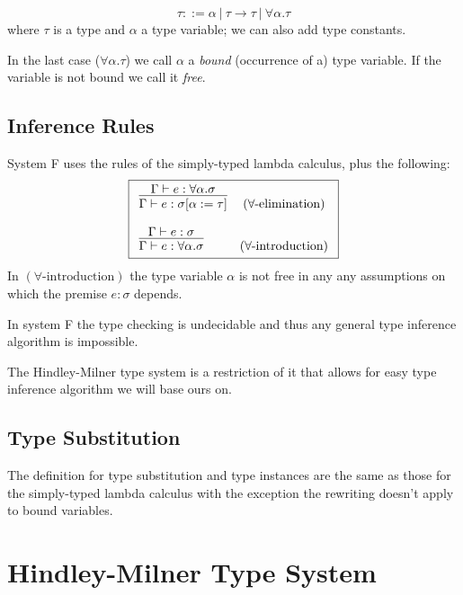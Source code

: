\begin{defn}[Type]
    $$\tau ::= \alpha\ |\ \tau \rightarrow \tau\ |\ \forall \alpha . \tau$$
    where $\tau$ is a type and $\alpha$ a type variable; we can also add type constants.
\end{defn}

In the last case ($\forall \alpha . \tau$) we call $\alpha$ a \emph{bound} (occurrence of a) type variable. If the variable is not bound we call it \emph{free}.

\subsection{Inference Rules}

\begin{defn}
    System F uses the rules of the simply-typed lambda calculus, plus the following:
    $$\boxed{\begin{array}{l c}
        \infer{\Gamma \vdash e : \sigma [\alpha := \tau]}{\Gamma \vdash e : \forall \alpha . \sigma} & (\text{$\forall$-elimination})\\\\
        \infer{\Gamma \vdash e : \forall \alpha . \sigma}{\Gamma \vdash e : \sigma} & (\text{$\forall$-introduction})
    \end{array}}$$
    In $(\text{$\forall$-introduction})$ the type variable $\alpha$ is not free in any any assumptions on which the premise $e : \sigma$ depends. %
\end{defn}

In system F the type checking is undecidable and thus any general type inference algorithm is impossible.

The Hindley-Milner type system is a restriction of it that allows for easy type inference algorithm we will base ours on.

\subsection{Type Substitution}

The definition for type substitution and type instances are the same as those for the simply-typed lambda calculus with the exception the rewriting doesn't apply to bound variables.

\section{Hindley-Milner Type System}

